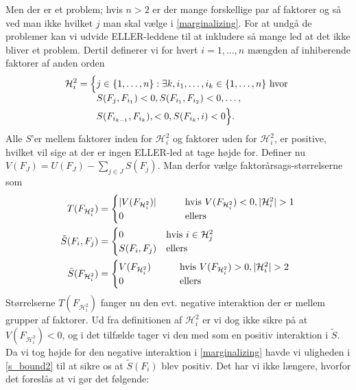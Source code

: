 \documentclass[a4paper, 12pt]{memoir}
\begin{document}
\begin{enumerate}[(i)]
Men der er et problem; hvis $n>2$ er der mange forskellige par af faktorer og så ved man ikke hvilket $j$ man skal vælge i \eqref{marginalizing}. For at undgå de problemer kan vi udvide ELLER-leddene til at inkludere så mange led at det ikke bliver et problem. Dertil definerer vi for hvert $i=1, \dots, n$ mængden af inhiberende faktorer af anden orden
\begin{equation*}
\mathcal H_i^2=\Bigl\{\begin{lgathered}[t]
j\in \{1, \dots, n\}: \exists k, i_1,\dots, i_k\in \mathcal \{1, \dots, n\} \textup{ hvor } \\
S(F_j, F_{i_1})<0, S(F_{i_1}, F_{i_2})<0, \dots, \\
S(F_{i_{k-1}}, F_{i_k}),<0, S(F_{i_k}, i)<0\Bigr\}.
\end{lgathered}
\end{equation*}
Alle $S$'er mellem faktorer inden for $\mathcal H_i^2$ og faktorer uden for $\mathcal H_i^2$, er positive, hvilket vil sige at der er ingen ELLER-led at tage højde for. Definer nu $V(F_{J})=U(F_J)-\sum_{j\in J}S(F_j)$.  Man derfor vælge faktorårsags-størrelserne som
\begin{align}
T(F_{\mathcal H_i^2})&=\begin{cases}|V(F_{\mathcal H_i^2})| \qquad &\textup{hvis } V(F_{\mathcal H_i^2})<0, |\mathcal H_i^2|>1\\
0 &\textup{ellers}
\end{cases}\\
\tilde S(F_i,F_j)&=\begin{cases}0 \qquad &\textup{hvis } i\in \mathcal H_j^2\\
S(F_i,F_j) &\textup{ellers}
\end{cases}\\
\tilde S(F_{\mathcal H_i^2})&=\begin{cases}
V(F_{\mathcal H_i^2}) \qquad &\textup{hvis } V(F_{\mathcal H_i^2})>0, |\mathcal H_i^2|>2\\
0 &\textup{ellers}
\end{cases}
\end{align}
Størrelserne $T(F_{\mathcal H_i^2})$ fanger nu den evt. negative interaktion der er mellem grupper af faktorer. Ud fra definitionen af $\mathcal H_i^2$ er vi dog ikke sikre på at $V(F_{\mathcal H_i^2})<0$, og i det tilfælde tager vi den med som en positiv interaktion i $\tilde S$. Da vi tog højde for den negative interaktion i \eqref{marginalizing} havde vi uligheden i \eqref{s_bound2} til at sikre os at $\tilde S(F_i)$ blev positiv. Det har vi ikke længere, hvorfor det foreslås at vi gør det følgende:


\end{enumerate}
\end{document}
